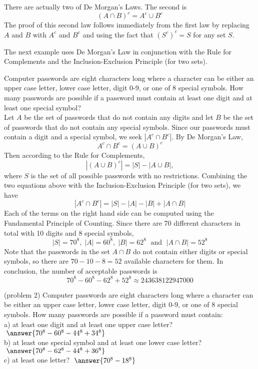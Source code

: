 \documentclass[handout]{ximera}
\begin{document}
\begin{remark}
There are actually two of De Morgan's Laws.  The second is
\[
\left(A \cap B\right)^c = A^c \cup B^c
\]
The proof of this second law follows immediately from the first law by replacing $A$ and $B$ with $A^c$ and $B^c$
and using the fact that $(S^c)^c = S$ for any set $S$.
\end{remark}


The next example uses De Morgan's Law in conjunction with the Rule for Complements and the 
Inclusion-Exclusion Principle (for two sets).

\begin{example}[example 2]
Computer passwords are eight characters long where a character can be either an upper case letter, 
lower case letter, digit 0-9, or one of 8 special symbols. 
How many passwords are possible if a password must contain at least one digit and at least one special symbol?\\

Let $A$ be the set of passwords that do not contain any digits and let $B$ be the set of passwords that do not
contain any special symbols. Since our passwords must contain a digit and a special symbol, we seek $|A^c \cap B^c|$.
By De Morgan's Law, 
\[
A^c \cap B^c = (A \cup B)^c
\]
Then according to the Rule for Complements,
\[
|(A \cup B)^c| = |S| - |A \cup B|,
\]
where $S$ is the set of all possible passwords with no restrictions. 
Combining the two equations above with the Inclusion-Exclusion Principle (for two sets), we have
\[
|A^c \cap B^c| = |S| - |A| - |B| + |A\cap B|
\]
Each of the terms on the right hand side can be computed using the Fundamental Principle of Counting. Since there are
70 different characters in total with 10 digits and 8 special symbols,
\[
|S| = 70^8, \; |A| = 60^8, \; |B| = 62^8 \; \text{ and } \; |A\cap B| = 52^8
\]
Note that the passwords in the set $A \cap B$ do not contain either digits or special symbols, so there are $70-10-8 = 52$
available characters for them. In conclusion, the number of acceptable passwords is
\[
70^8 - 60^8 - 62^8 + 52^8 \approx 243638122947000
\]

\end{example}

\begin{problem}(problem 2)
Computer passwords are eight characters long where a character can be either an upper case letter, 
lower case letter, digit 0-9, or one of 8 special symbols. 
How many passwords are possible if a password must contain:\\
a) at least one digit and at least one upper case letter? $\; \answer{70^8 - 60^8 - 44^8 + 34^8}$\\
b) at least one special symbol and at least one lower case letter? $\; \answer{70^8 - 62^8 - 44^8 + 36^8}$\\
c) at least one letter? $\; \answer{70^8 - 18^8}$\\
\end{problem}
\end{document}

